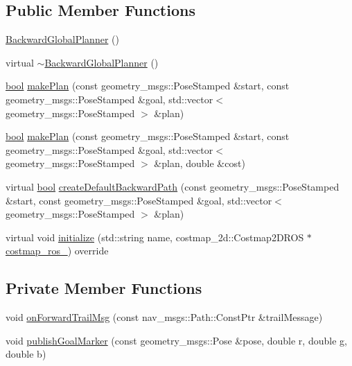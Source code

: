 \subsection*{Public Member Functions}
\begin{DoxyCompactItemize}
\item 
\hyperlink{classcl__move__base__z_1_1backward__global__planner_1_1BackwardGlobalPlanner_a20888ea9b40dcbd86b8b12310a2ad60b}{Backward\+Global\+Planner} ()
\item 
virtual \hyperlink{classcl__move__base__z_1_1backward__global__planner_1_1BackwardGlobalPlanner_a2011b04d7fd3fa18ab940779ee6d6d8c}{$\sim$\+Backward\+Global\+Planner} ()
\item 
\hyperlink{classbool}{bool} \hyperlink{classcl__move__base__z_1_1backward__global__planner_1_1BackwardGlobalPlanner_a3f1f3c81e7c52c9305544fd793741a41}{make\+Plan} (const geometry\+\_\+msgs\+::\+Pose\+Stamped \&start, const geometry\+\_\+msgs\+::\+Pose\+Stamped \&goal, std\+::vector$<$ geometry\+\_\+msgs\+::\+Pose\+Stamped $>$ \&plan)
\item 
\hyperlink{classbool}{bool} \hyperlink{classcl__move__base__z_1_1backward__global__planner_1_1BackwardGlobalPlanner_a2fe289017031d072f4ac32d017fe989d}{make\+Plan} (const geometry\+\_\+msgs\+::\+Pose\+Stamped \&start, const geometry\+\_\+msgs\+::\+Pose\+Stamped \&goal, std\+::vector$<$ geometry\+\_\+msgs\+::\+Pose\+Stamped $>$ \&plan, double \&cost)
\item 
virtual \hyperlink{classbool}{bool} \hyperlink{classcl__move__base__z_1_1backward__global__planner_1_1BackwardGlobalPlanner_a1b4d2eb717f9f63f2309def37c6ce297}{create\+Default\+Backward\+Path} (const geometry\+\_\+msgs\+::\+Pose\+Stamped \&start, const geometry\+\_\+msgs\+::\+Pose\+Stamped \&goal, std\+::vector$<$ geometry\+\_\+msgs\+::\+Pose\+Stamped $>$ \&plan)
\item 
virtual void \hyperlink{classcl__move__base__z_1_1backward__global__planner_1_1BackwardGlobalPlanner_af17978c77ec96d4ecc26b3a6ba75e1e9}{initialize} (std\+::string name, costmap\+\_\+2d\+::\+Costmap2\+D\+R\+OS $\ast$\hyperlink{classcl__move__base__z_1_1backward__global__planner_1_1BackwardGlobalPlanner_a7103c15e6540a514acd421c3c6e194a4}{costmap\+\_\+ros\+\_\+}) override
\end{DoxyCompactItemize}
\subsection*{Private Member Functions}
\begin{DoxyCompactItemize}
\item 
void \hyperlink{classcl__move__base__z_1_1backward__global__planner_1_1BackwardGlobalPlanner_a515bde5bfb3ae548f3e19209df1a48b0}{on\+Forward\+Trail\+Msg} (const nav\+\_\+msgs\+::\+Path\+::\+Const\+Ptr \&trail\+Message)
\item 
void \hyperlink{classcl__move__base__z_1_1backward__global__planner_1_1BackwardGlobalPlanner_a3c6784cad10fdadf28323380fe3d6d2b}{publish\+Goal\+Marker} (const geometry\+\_\+msgs\+::\+Pose \&pose, double r, double g, double b)
\end{DoxyCompactItemize}
